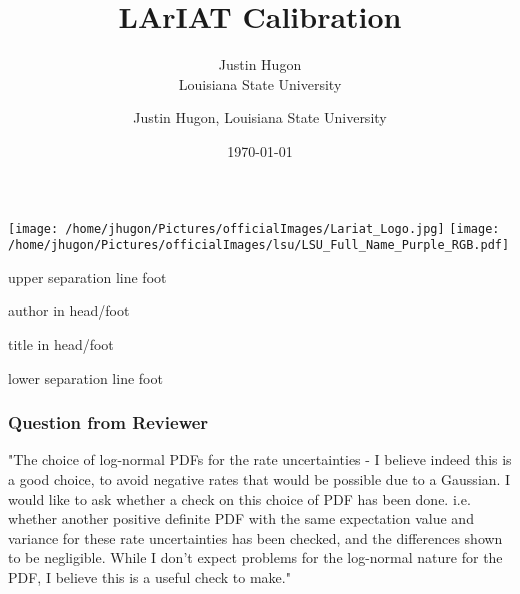 \documentclass{hugontalk}
\title{LArIAT Calibration}
\date{\today}
\author{Justin Hugon \\ Louisiana State University}
\begin{document}
\begin{frame}
  \maketitle
\vspace{-1em}
  \texttt{[image: /home/jhugon/Pictures/officialImages/Lariat\_Logo.jpg]}
  \hfill
  \texttt{[image: /home/jhugon/Pictures/officialImages/lsu/LSU\_Full\_Name\_Purple\_RGB.pdf]}
\end{frame}

\makeatletter
{}
{
    \begin{beamercolorbox}[colsep=1.5pt]{upper separation line foot}
    \end{beamercolorbox}
    \begin{beamercolorbox}[ht=2.5ex,dp=1.125ex,%
      leftskip=.3cm,rightskip=.3cm plus1fil]{author in head/foot}%
      \hfill%
      {\insertshortinstitute}%
    \end{beamercolorbox}%
    \begin{beamercolorbox}[ht=2.5ex,dp=1.125ex,%
      leftskip=.3cm,rightskip=.3cm plus1fil]{title in head/foot}%
      {\insertshorttitle \hfill \insertframenumber}%
    \end{beamercolorbox}%
    \begin{beamercolorbox}[colsep=1.5pt]{lower separation line foot}
    \end{beamercolorbox}
}
\makeatother

\author{Justin Hugon, Louisiana State University}


\begin{frame}
\frametitle{Question from Reviewer}
"The choice of log-normal PDFs for the rate uncertainties - I believe
indeed this is a good choice, to avoid negative rates that would be
possible due to a Gaussian. I would like to ask whether a check on this
choice of PDF has been done. i.e. whether another positive definite PDF
with the same expectation value and variance for these rate
uncertainties has been checked, and the differences shown to be
negligible. While I don't expect problems for the log-normal nature for
the PDF, I believe this is a useful check to make."
\end{frame}
\end{document}
